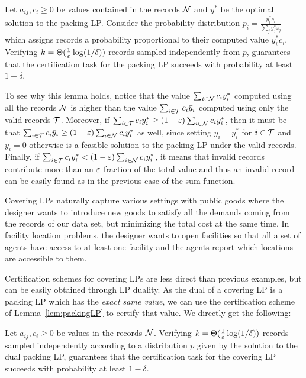 \begin{lemma} \label{lem:packingLP}
    Let $a_{ij}, c_i  \ge 0$ be values contained in the records $\mathcal{N}$ and $y^*$ be the optimal solution to the 
  packing LP. Consider the probability distribution $p_i = \frac {y^*_i c_i} {\sum_j y^*_j z_j}$ which assigns records 
  a probability proportional to their computed value $y^*_i c_i$. Verifying $k=\Theta(\frac{1}{\varepsilon}\log (1/\delta))$ 
  records sampled independently from $p$, guarantees that the certification task for the packing LP succeeds with 
  probability at least $1 - \delta$.
\end{lemma}

  To see why this lemma holds, notice that the value $\sum_{i \in \mathcal{N}} c_i y^*_i$ computed using all the records 
$\mathcal{N}$ is higher than the value $\sum_{i \in \mathcal{T}} c_i \bar y_i$ computed using only the valid records $\mathcal{T}$. 
Moreover, if $\sum_{i \in \mathcal{T}} c_i y^*_i \ge (1-\varepsilon) \sum_{i \in \mathcal{N}} c_i y^*_i$, then it must be that
$\sum_{i \in \mathcal{T}} c_i \bar y_i \ge (1-\varepsilon) \sum_{i \in \mathcal{N}} c_i y^*_i$ as well, since setting $y_i = y^*_i$ 
for $i\in \mathcal{T}$ and $y_i=0$ otherwise is a feasible solution to the packing LP under the valid records. Finally, if  
$\sum_{i \in \mathcal{T}} c_i y^*_i < (1-\varepsilon) \sum_{i \in \mathcal{N}} c_i y^*_i$, it means that invalid records contribute 
more than an $\varepsilon$ fraction of the total value and thus an invalid record can be easily found as in the previous case
of the sum function.

  Covering LPs naturally capture various settings with public goods where the designer wants to introduce new goods to
satisfy all the demands coming from the records of our data set, but minimizing the total cost at the same time. In 
facility location problems, the designer wants to open facilities so that all a set of agents have access to at least
one facility and the agents report which locations are accessible to them.

  Certification schemes for covering LPs are less direct than previous examples, but can be easily obtained through LP 
duality. As the dual of a covering LP is a packing LP which has the \emph{exact same value}, we can use the certification 
scheme of Lemma~\ref{lem:packingLP} to certify that value. We directly get the following:

\begin{lemma} \label{lem:coveringLp}
    Let $a_{ij}, c_i \ge 0$ be values in the records $\mathcal{N}$. Verifying $k=\Theta(\frac{1}{\varepsilon}\log (1/\delta))$ records 
  sampled independently according to a distribution $p$ given by the solution to the dual packing LP, guarantees that the 
  certification task for the covering LP succeeds with probability at least $1 - \delta$.
\end{lemma}

